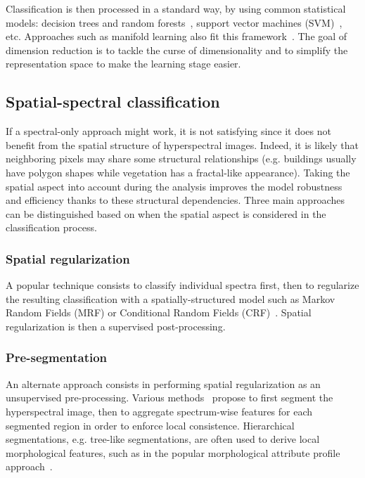 \documentclass[journal]{IEEEtran}
\begin{document}
Classification is then processed in a standard way, by using common statistical models: decision trees and random forests~\cite{ham-crawford-RF-HSI-TGRS2005}, support vector machines (SVM)~\cite{melgani-bruzzone-HSI-SVM-TGRS2004,gualtieri-cromp-HSI-SVM-SPIE1999}, etc. Approaches such as manifold learning also fit this framework~\cite{chapel_perturbo_2014}. The goal of dimension reduction is to tackle the curse of dimensionality and to simplify the representation space to make the learning stage easier.






\subsection{Spatial-spectral classification}

If a spectral-only approach might work, it is not satisfying since it does not benefit from the spatial structure of hyperspectral images. Indeed, it is likely that neighboring pixels may share some structural relationships (e.g. buildings usually have polygon shapes while vegetation has a fractal-like appearance). Taking the spatial aspect into account during the analysis improves the model robustness and efficiency thanks to these structural dependencies. Three main approaches can be distinguished based on when the spatial aspect is considered in the classification process.



\subsubsection{Spatial regularization}

A popular technique consists to classify individual spectra first, then to regularize the resulting classification with a spatially-structured model such as Markov Random Fields (MRF) or Conditional Random Fields (CRF)~\cite{wu_semi-supervised_2016}. Spatial regularization is then a supervised post-processing.



\subsubsection{Pre-segmentation}

An alternate approach consists in performing spatial regularization as an unsupervised pre-processing. Various methods~\cite{tarabalka_segmentation_2010,fauvel_advances_2013,aptoula_vector_2016} propose
 to first segment the hyperspectral image, then to aggregate spectrum-wise features for each segmented region in order to enforce local consistence. Hierarchical segmentations, e.g. tree-like segmentations, are often used to derive local morphological features, such as in the popular morphological attribute profile approach~\cite{dallamura_extended_2010}.
 
\end{document}
